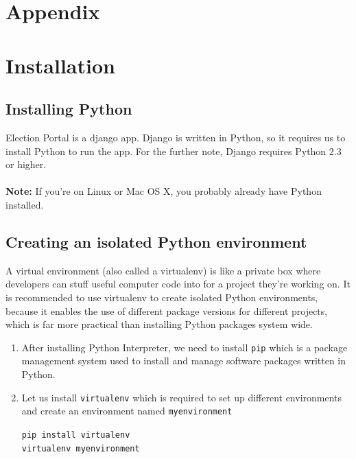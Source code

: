 \documentclass[12pt, a4paper, titlepage]{article}
\begin{document}
\section{Appendix}
\section{Installation}
\subsection{Installing Python}

Election Portal is a django app. Django is written in Python, so it requires us to install Python to run the app. For the further note, Django requires Python 2.3 or higher. \\ \\
\textbf{Note:} If you’re on Linux or Mac OS X, you probably already have Python installed.

\subsection{Creating an isolated Python environment}
A virtual environment (also called a virtualenv) is like a private box where developers can stuff useful computer code into for a project they're working on. It is recommended to use virtualenv to create isolated Python environments, because it enables the use of different package versions for different projects, which is far more practical than installing Python packages system wide.
\begin{enumerate}
\item After installing Python Interpreter, we need to install \verb|pip| which is a package management system used to install and manage software packages written in Python.     

\item Let us install \verb|virtualenv| which is required to set up different environments and create an environment named \verb|myenvironment|
\begin{center}
\verb|pip install virtualenv|\\
\verb|virtualenv myenvironment|
\end{center}
\end{enumerate}
\end{document}
